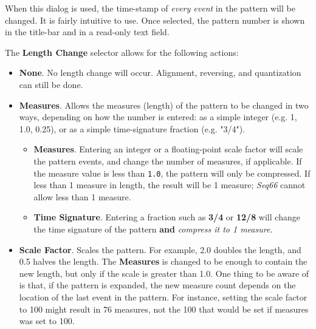    When this dialog is used, the time-stamp of \textsl{every event} in the
   pattern will be changed.
   It is fairly intuitive to use.
   Once selected, the pattern number is shown in the title-bar and in a
   read-only text field.

   The \textbf{Length Change} selector allows for the following actions:

   \begin{itemize}
      \item \textbf{None}.
         No length change will occur.
         Alignment, reversing, and quantization can still be done.
      \item \textbf{Measures}.
         Allows the measures (length) of the pattern to be changed in two ways,
         depending on how the number is entered: as a simple integer (e.g.
         1, 1.0, 0.25),
         or as a simple time-signature fraction (e.g. "3/4").
         \begin{itemize}
            \item \textbf{Measures}.
               Entering an integer or a floating-point scale factor will scale
               the pattern events,
               and change the number of measures, if applicable.
               If the measure value is less than \texttt{1.0},
               the pattern will only be compressed.
               If less than 1 measure in length, the result will be
               1 measure; \textsl{Seq66} cannot allow less than 1 measure.
            \item \textbf{Time Signature}.
               Entering a fraction such as \textbf{3/4} or
               \textbf{12/8} will change the time signature of the pattern
               \textbf{and} \textsl{compress it to 1 measure}.
         \end{itemize}
      \item \textbf{Scale Factor}.
         Scales the pattern.  For example, 2.0 doubles the length, and 0.5
         halves the length.
         The \textbf{Measures} is changed to be enough to contain the new length,
         but only if the scale is greater than 1.0.
         One thing to be aware of is that, if the pattern is expanded, the
         new measure count depends on the location of the last event in the
         pattern. For instance, setting the scale factor to 100 might result in
         76 measures, not the 100 that would be set if measures was set to 100.
   \end{itemize}

